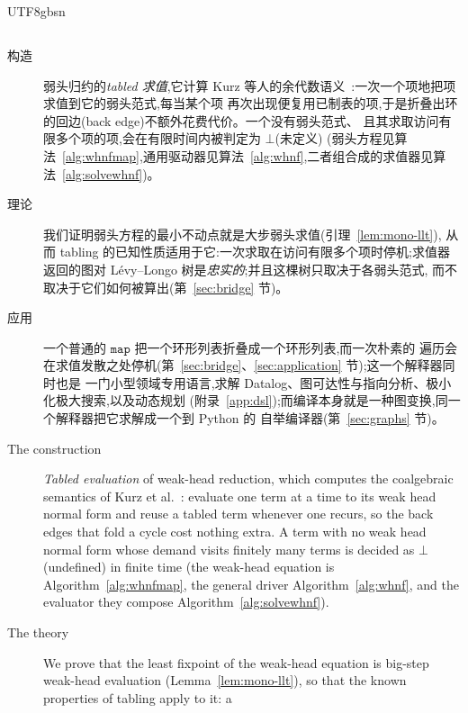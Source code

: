 \begin{CJK*}{UTF8}{gbsn}
  \subsection{}
  \ifPaperChinese
  \begin{description}
    \item[构造] 弱头归约的\emph{tabled 求值},它计算 Kurz 等人的余代数语义~\cite{kurz2013-nominal-coalgebraic-data-types}:一次一个项地把项求值到它的弱头范式,每当某个项
      再次出现便复用已制表的项,于是折叠出环的回边(back edge)不额外花费代价。一个没有弱头范式、
      且其求取访问有限多个项的项,会在有限时间内被判定为 $\bot$(未定义)
      (弱头方程见算法~\ref{alg:whnfmap},通用驱动器见算法~\ref{alg:whnf},二者组合成的求值器见算法~\ref{alg:solvewhnf})。
    \item[理论] 我们证明弱头方程的最小不动点就是大步弱头求值(引理~\ref{lem:mono-llt}),
      从而 tabling 的已知性质适用于它:一次求取在访问有限多个项时停机;求值器返回的图对 Lévy--Longo
      树是\emph{忠实的};并且这棵树只取决于各弱头范式,
      而不取决于它们如何被算出(第~\ref{sec:bridge} 节)。
    \item[应用] 一个普通的 $\mathtt{map}$ 把一个环形列表折叠成一个环形列表,而一次朴素的
      遍历会在求值发散之处停机(第~\ref{sec:bridge}、\ref{sec:application} 节);这一个解释器同时也是
      一门小型领域专用语言,求解 Datalog、图可达性与指向分析、极小化极大搜索,以及动态规划
      (附录~\ref{app:dsl});而编译本身就是一种图变换,同一个解释器把它求解成一个到 Python 的
      自举编译器(第~\ref{sec:graphs} 节)。
  \end{description}
  \else
  \begin{description}
    \item[The construction] \emph{Tabled evaluation} of weak-head reduction, which computes the coalgebraic semantics of Kurz et al.~\cite{kurz2013-nominal-coalgebraic-data-types}: evaluate
      one term at a time to its weak head normal form and reuse a tabled term whenever one recurs, so the back
      edges that fold a cycle cost nothing extra. A term with no weak head normal form whose
      demand visits finitely many terms is decided as $\bot$ (undefined) in finite time
      (the weak-head equation is Algorithm~\ref{alg:whnfmap}, the general driver Algorithm~\ref{alg:whnf}, and the evaluator they compose Algorithm~\ref{alg:solvewhnf}).
    \item[The theory] We prove that the least fixpoint of the weak-head equation is big-step
      weak-head evaluation (Lemma~\ref{lem:mono-llt}), so that the known properties of tabling apply to it: a

\end{description}
\end{CJK*}
